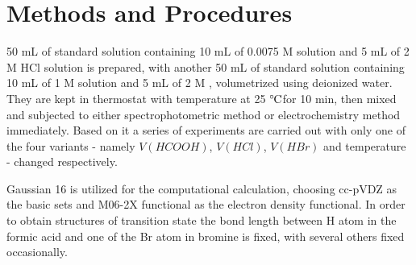 \documentclass[%
preprint,
 amsmath,amssymb,
 aps,
10.5pt,
]{revtex4-1}
\newcommand{\celsius}{\ensuremath{^\circ\hspace{-0.09em}\mathrm{C}}}
\begin{document}
\section{Methods and Procedures}
50 mL of standard solution containing 10 mL of 0.0075 M  solution and 5 mL of 2 M HCl solution is prepared, with another 50 mL of standard solution containing 10 mL of 1 M  solution and 5 mL of 2 M , volumetrized using deionized water. They are kept in thermostat with temperature at 25 \celsius for 10 min, then mixed and subjected to either spectrophotometric method or electrochemistry method immediately. Based on it a series of experiments are carried out with only one of the four variants - namely $V(HCOOH)$, $V(HCl)$, $V(HBr)$ and temperature - changed respectively.

Gaussian 16 is utilized for the computational calculation, choosing cc-pVDZ as the basic sets and M06-2X functional as the electron density functional. In order to obtain structures of transition state the bond length between H atom in the formic acid and one of the Br atom in bromine is fixed, with several others fixed occasionally.
\end{document}
